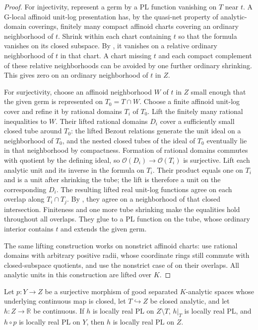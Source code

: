 \begin{proof}
For injectivity, represent a germ by a PL function vanishing on $T$ near $t$. A G-local affinoid unit-log presentation has, by the quasi-net property of analytic-domain coverings, finitely many compact affinoid charts covering an ordinary neighborhood of $t$. Shrink within each chart containing $t$ so that the formula vanishes on its closed subspace. By , it vanishes on a relative ordinary neighborhood of $t$ in that chart. A chart missing $t$ and each compact complement of these relative neighborhoods can be avoided by one further ordinary shrinking. This gives zero on an ordinary neighborhood of $t$ in $Z$.

For surjectivity, choose an affinoid neighborhood $W$ of $t$ in $Z$
small enough that the given germ is represented on $T_0=T\cap W$. Choose a finite affinoid unit-log cover and refine it by rational domains $T_i$ of $T_0$. Lift the finitely many rational inequalities to $W$. Their lifted rational domains $D_i$ cover a sufficiently small closed tube around $T_0$: the lifted Bezout relations generate the unit ideal on a neighborhood of $T_0$, and the nested closed tubes of the ideal of $T_0$ eventually lie in that neighborhood by compactness. Formation of rational domains commutes with quotient by the defining ideal, so $\mathcal O(D_i)\to\mathcal O(T_i)$ is surjective. Lift each analytic unit and its inverse in the formula on $T_i$. Their product equals one on $T_i$ and is a unit after shrinking the tube; the lift is therefore a unit on the corresponding $D_i$. The resulting lifted real unit-log functions agree on each overlap along $T_i\cap T_j$. By , they agree on a neighborhood of that closed intersection. Finiteness and one more tube shrinking make the equalities hold throughout all overlaps. They glue to a PL function on the tube, whose ordinary interior contains $t$ and extends the given germ.

The same lifting construction works on nonstrict affinoid charts: use rational domains with arbitrary positive radii, whose coordinate rings still commute with closed-subspace quotients, and use the nonstrict case of  on their overlaps. All analytic units in this construction are lifted over $K$.
\end{proof}

\begin{proposition}\label{prop:supplied-p061-proper-modification-descent}
Let $p:Y\to Z$ be a surjective morphism of good separated $K$-analytic spaces whose underlying continuous map is closed, let $T\hookrightarrow Z$ be closed analytic, and let $h:Z\to\mathbb R$ be continuous. If $h$ is locally real PL on $Z\setminus T$, $h|_T$ is locally real PL, and $h\circ p$ is locally real PL on $Y$, then $h$ is locally real PL on $Z$.
\end{proposition}

